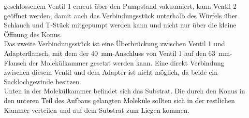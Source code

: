 geschlossenem Ventil 1 erneut über den Pumpstand vakuumiert, kann Ventil 2 geöffnet werden, damit auch das Verbindungsstück
unterhalb des Würfels über Schlauch und T-Stück mitgepumpt werden kann und nicht nur über die kleine Öffnung
des Konus.\\
Das zweite Verbindungsstück ist eine Überbrückung zwischen Ventil 1 und Adapterflansch, mit dem
der \SI{40}{mm}-Anschluss von Ventil 1 %
auf den \SI{63}{mm}-Flansch der Molekülkammer gesetzt werden kann. Eine direkt Verbindung zwischen
diesem Ventil und dem Adapter ist nicht möglich, da beide ein Sacklochgewinde besitzen.\\
Unten in der Molekülkammer befindet sich das Substrat. Die durch den Konus in den unteren Teil des Aufbaus
gelangten Moleküle sollten sich in der restlichen Kammer verteilen und auf dem Substrat zum Liegen kommen.

\FloatBarrier

